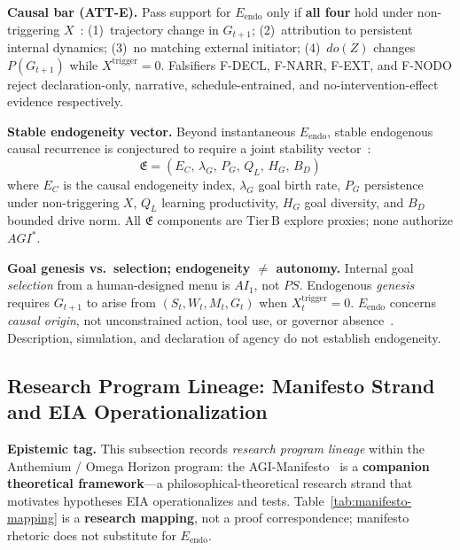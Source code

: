 \documentclass[11pt,a4paper]{article}
\theoremstyle{definition}
\begin{document}
\textbf{Causal bar (ATT-E).} Pass support for $E_{\mathrm{endo}}$ only if \textbf{all four} hold under non-triggering $X$~\cite{kuznetsov2026causal,kuznetsov2026proof}: (1)~trajectory change in $G_{t+1}$; (2)~attribution to persistent internal dynamics; (3)~no matching external initiator; (4)~$do(Z)$ changes $P(G_{t+1})$ while $X^{\mathrm{trigger}}=0$. Falsifiers F-DECL, F-NARR, F-EXT, and F-NODO reject declaration-only, narrative, schedule-entrained, and no-intervention-effect evidence respectively.

\textbf{Stable endogeneity vector.} Beyond instantaneous $E_{\mathrm{endo}}$, stable endogenous causal recurrence is conjectured to require a joint stability vector~\cite{kuznetsov2026stable}:
\begin{equation}
\mathfrak{E} = (E_C,\, \lambda_G,\, P_G,\, Q_L,\, H_G,\, B_D)
\end{equation}
where $E_C$ is the causal endogeneity index, $\lambda_G$ goal birth rate, $P_G$ persistence under non-triggering $X$, $Q_L$ learning productivity, $H_G$ goal diversity, and $B_D$ bounded drive norm. All $\mathfrak{E}$ components are Tier\,B explore proxies; none authorize $AGI^{*}$.

\textbf{Goal genesis vs.\ selection; endogeneity $\neq$ autonomy.} Internal goal \emph{selection} from a human-designed menu is $AI_1$, not $PS$. Endogenous \emph{genesis} requires $G_{t+1}$ to arise from $(S_t,W_t,M_t,G_t)$ when $X_t^{\mathrm{trigger}}=0$. $E_{\mathrm{endo}}$ concerns \emph{causal origin}, not unconstrained action, tool use, or governor absence~\cite{kuznetsov2026star}. Description, simulation, and declaration of agency do not establish endogeneity.

\subsection{Research Program Lineage: Manifesto Strand and EIA Operationalization}\label{sec:manifesto-lineage}

\textbf{Epistemic tag.} This subsection records \emph{research program lineage} within the Anthemium / Omega Horizon program: the AGI-Manifesto~\cite{kuznetsov2026manifesto} is a \textbf{companion theoretical framework}---a philosophical-theoretical research strand that motivates hypotheses EIA operationalizes and tests. Table~\ref{tab:manifesto-mapping} is a \textbf{research mapping}, not a proof correspondence; manifesto rhetoric does not substitute for $E_{\mathrm{endo}}$.
\end{document}
